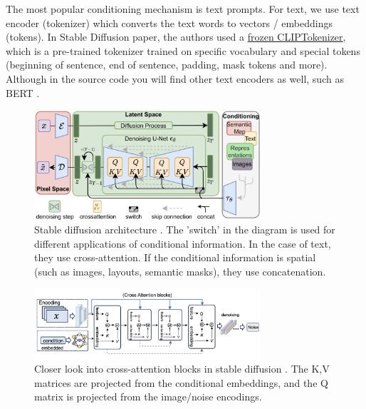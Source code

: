 The most popular conditioning mechanism is text prompts. For text, we use text encoder (tokenizer) which converts the text words to vectors / embeddings (tokens). In Stable Diffusion paper, the authors used a \href{https://github.com/CompVis/latent-diffusion/blob/a506df5756472e2ebaf9078affdde2c4f1502cd4/ldm/modules/encoders/modules.py#L138}{frozen CLIPTokenizer}, which is a pre-trained tokenizer trained on specific vocabulary and special tokens (beginning of sentence, end of sentence, padding, mask tokens and more). Although in the source code you will find other text encoders as well, such as BERT \cite{bert}.

\begin{figure}
    \centering
    \includegraphics[width=0.75\textwidth]{images/diffusion_models/stable_diffusion/architecture.png}
    \caption{Stable diffusion architecture \cite{stable_diffusion}. The 'switch' in the diagram is used for different applications of conditional information. In the case of text, they use cross-attention. If the conditional information is spatial (such as images, layouts, semantic masks), they use concatenation.}
    \label{fig:stable_diffusion_architecture}
\end{figure}

\begin{figure}
    \centering
    \includegraphics[width=0.75\textwidth]{images/diffusion_models/stable_diffusion/cross_attention.png}
    \caption{Closer look into cross-attention blocks in stable diffusion \cite{sun2024sora}. The K,V matrices are projected from the conditional embeddings, and the Q matrix is projected from the image/noise encodings.}
\end{figure}

